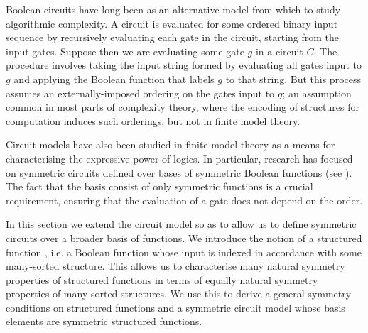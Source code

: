\documentclass[../paper.tex]{subfiles}
\begin{document}
Boolean circuits have long been as an alternative model from which to study
algorithmic complexity. A circuit is evaluated for some ordered binary input
sequence by recursively evaluating each gate in the circuit, starting from the
input gates. Suppose then we are evaluating some gate $g$ in a circuit $C$. The
procedure involves taking the input string formed by evaluating all gates input
to $g$ and applying the Boolean function that labels $g$ to that string. But
this process assumes an externally-imposed ordering on the gates input to $g$;
an assumption common in most parts of complexity theory, where the encoding of
structures for computation induces such orderings, but not in finite model
theory.

Circuit models have also been studied in finite model theory as a means for
characterising the expressive power of logics. In particular, research has
focused on symmetric circuits defined over bases of symmetric Boolean functions
(see \cite{}). The fact that the basis consist of only symmetric functions is a
crucial requirement, ensuring that the evaluation of a gate does not depend on
the order.

In this section we extend the circuit model so as to allow us to define
symmetric circuits over a broader basis of functions. We introduce the notion of
a structured function , i.e. a Boolean function whose input is indexed in
accordance with some many-sorted structure. This allows us to characterise many
natural symmetry properties of structured functions in terms of equally natural
symmetry properties of many-sorted structures. We use this to derive a general
symmetry conditions on structured functions and a symmetric circuit model whose
basis elements are symmetric structured functions.


\end{document}
